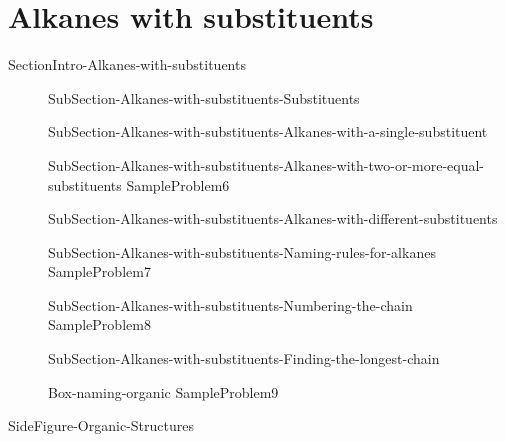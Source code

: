 \documentclass[main.tex]{subfiles}
\newcommand\chapterlabel{Ch-orgo}\setcounter{figurenewcounter}{0}\setcounter{tablenewcounter}{0}\setcounter{formulanewcounter}{0}
\begin{document}
 
\section{Alkanes with substituents}{SectionIntro-Alkanes-with-substituents}
\sloppy\begin{description}
\item[]{SubSection-Alkanes-with-substituents-Substituents}
\item[]{SubSection-Alkanes-with-substituents-Alkanes-with-a-single-substituent}
\newpage\hspace{-3cm}{Table-Substituents}
\item[]{SubSection-Alkanes-with-substituents-Alkanes-with-two-or-more-equal-substituents}
{SampleProblem6}
\item[]{SubSection-Alkanes-with-substituents-Alkanes-with-different-substituents}
\item[]{SubSection-Alkanes-with-substituents-Naming-rules-for-alkanes}
{SampleProblem7}
\item[]{SubSection-Alkanes-with-substituents-Numbering-the-chain}
{SampleProblem8}
\item[]{SubSection-Alkanes-with-substituents-Finding-the-longest-chain}
\item[]{Box-naming-organic} 
{SampleProblem9}
\end{description}



{SideFigure-Organic-Structures}
\end{document}
